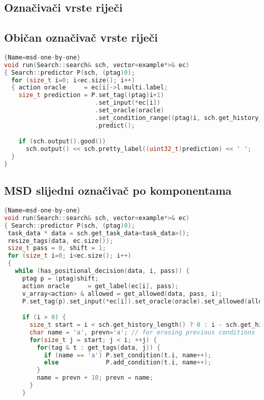 \begin{appendix}
\chapter{Označivači vrste riječi}
\section{Običan označivač vrste riječi}
\label{appendix:postagging}
\begin{lstlisting}[language=C++,
                   basicstyle=\tiny\ttfamily]{Name=msd-one-by-one}
void run(Search::search& sch, vector<example*>& ec)
{ Search::predictor P(sch, (ptag)0);
  for (size_t i=0; i<ec.size(); i++)
  { action oracle     = ec[i]->l.multi.label;
    size_t prediction = P.set_tag((ptag)i+1)
                         .set_input(*ec[i])
                         .set_oracle(oracle)
                         .set_condition_range((ptag)i, sch.get_history_length(), 'p')
                         .predict();

    if (sch.output().good())
      sch.output() << sch.pretty_label((uint32_t)prediction) << ' ';
  }
}
\end{lstlisting}
\newpage
\section{MSD slijedni označivač po komponentama}\label{code:msdcomp}
\begin{lstlisting}[language=C++,
                   basicstyle=\tiny\ttfamily]{Name=msd-one-by-one}
void run(Search::search& sch, vector<example*>& ec)
{ Search::predictor P(sch, (ptag)0);
 task_data * data = sch.get_task_data<task_data>();
 resize_tags(data, ec.size());
 size_t pass = 0, shift = 1;
 for (size_t i=0; i<ec.size(); i++)
 {
   while (has_positional_decision(data, i, pass)) {
     ptag p = (ptag)shift;
     action oracle     = get_label(ec[i], pass);
     v_array<action> & allowed = get_allowed(data, pass, i);
     P.set_tag(p).set_input(*ec[i]).set_oracle(oracle).set_allowed(allowed);

     if (i > 0) {
       size_t start = i < sch.get_history_length() ? 0 : i - sch.get_history_length();
       char name = 'a', prevn='a'; // for erasing previous conditions
       for(size_t j = start; j < i; ++j) {
         for(tag & t : get_tags(data, j)) {
           if (name == 'a') P.set_condition(t.i, name++);
           else             P.add_condition(t.i, name++);
         }
         name = prevn + 10; prevn = name;
       }
     }


\end{lstlisting}
\end{appendix}
